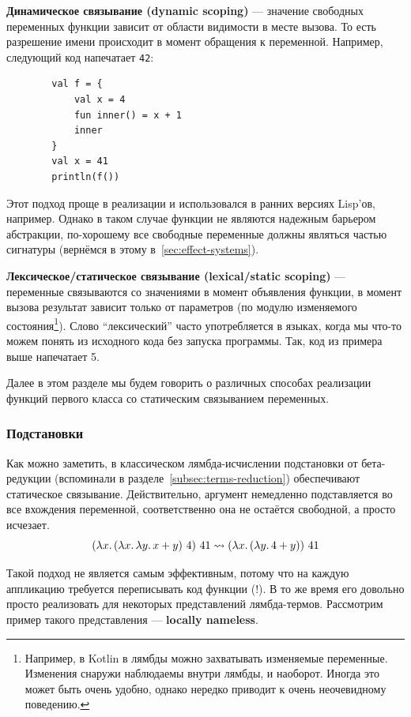 \documentclass[12pt]{article}
\newcommand{\vocab}[1]{\textbf{#1}} %
\newcommand{\ap}{~}
\begin{document}
    \vocab{Динамическое связывание (dynamic scoping)} --- значение свободных переменных функции зависит от области видимости в месте вызова.
    То есть разрешение имени происходит в момент обращения к переменной.
    Например, следующий код напечатает \texttt{42}:
    \begin{verbatim}
        val f = {
            val x = 4
            fun inner() = x + 1
            inner
        }
        val x = 41
        println(f())
    \end{verbatim}

    Этот подход проще в реализации и использовался в ранних версиях Lisp'ов, например.
    Однако в таком случае функции не являются надежным барьером абстракции, по-хорошему все свободные переменные должны являться частью сигнатуры (вернёмся в этому в~\ref{sec:effect-systems}).

    \vocab{Лексическое/статическое связывание (lexical/static scoping)} --- переменные связываются со значениями в момент объявления функции, в момент вызова результат зависит только от параметров (по модулю изменяемого состояния\footnote{Например, в Kotlin в лямбды можно захватывать изменяемые переменные. Изменения снаружи наблюдаемы внутри лямбды, и наоборот. Иногда это может быть очень удобно, однако нередко приводит к очень неочевидному поведению.}).
    Слово ``лексический'' часто употребляется в языках, когда мы что-то можем понять из исходного кода без запуска программы.
    Так, код из примера выше напечатает 5.

    Далее в этом разделе мы будем говорить о различных способах реализации функций первого класса со статическим связыванием переменных.

    \subsubsection{Подстановки}

    Как можно заметить, в классическом лямбда-исчислении подстановки от бета-редукции (вспоминали в разделе~\ref{subsec:terms-reduction}) обеспечивают статическое связывание.
    Действительно, аргумент немедленно подставляется во все вхождения переменной, соответственно она не остаётся свободной, а просто исчезает.
    \[
        (\lambda x\ldotp (\lambda x\ldotp \lambda y\ldotp x + y) \ap 4) \ap 41 \rightsquigarrow (\lambda x\ldotp (\lambda y\ldotp 4 + y)) \ap 41
    \]

    Такой подход не является самым эффективным, потому что на каждую аппликацию требуется переписывать код функции (!).
    В то же время его довольно просто реализовать для некоторых представлений лямбда-термов.
    Рассмотрим пример такого представления --- \vocab{locally nameless}.
\end{document}
